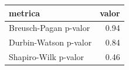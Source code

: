 \begin{table}[ht]
\centering
\begin{tabular}{lr}
  \hline
metrica & valor \\ 
  \hline
Breusch-Pagan p-valor & 0.94 \\ 
  Durbin-Watson p-valor & 0.84 \\ 
  Shapiro-Wilk p-valor & 0.46 \\ 
   \hline
\end{tabular}
\end{table}

